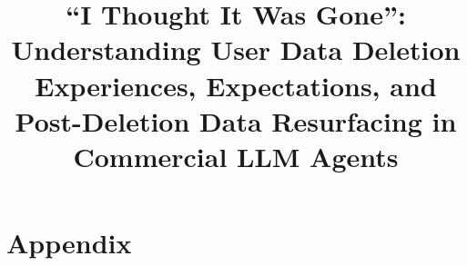 \documentclass[conference,compsoc]{IEEEtran}
\begin{document}
\title{``I Thought It Was Gone'': Understanding User Data Deletion Experiences, Expectations, and Post-Deletion Data Resurfacing in Commercial LLM Agents}

\maketitle


\IEEEpeerreviewmaketitle














\section*{Appendix}

\end{document}
